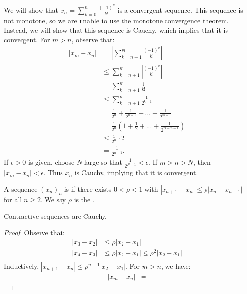     \begin{example}
        We will show that $x_n = \sum_{k = 0}^n \frac{(-1)^k}{k!}$ is a convergent sequence. This sequence is not monotone, so we are unable to use the monotone convergence theorem. Instead, we will show that this sequence is Cauchy, which implies that it is convergent. For $m > n$, observe that:
            \begin{equation*}
            \begin{split}
                |x_m - x_n|
                & = \left|\sum_{k = n + 1}^m \frac{(-1)^k}{k!}\right| \\
                & \leq \sum_{k = n + 1}^m \left|\frac{(-1)^k}{k!}\right| \\
                & = \sum_{k = n+1}^m \frac{1}{k!} \\
                & \leq \sum_{k = n+1}^m \frac{1}{2^{k-1}} \\
                & = \frac{1}{2^n} + \frac{1}{2^{n+1}} + ... + \frac{1}{2^{m-1}} \\
                & = \frac{1}{2^n} \left(1 + \frac{1}{2} + ... + \frac{1}{2^{m-n-1}}\right) \\
                & \leq \frac{1}{2^n}\cdot 2 \\
                & = \frac{1}{2^{n-1}}.
            \end{split}
            \end{equation*}
        If $\epsilon > 0$ is given, choose $N$ large so that $\frac{1}{2^{N - 1}} < \epsilon$. If $m > n > N$, then $|x_m - x_n| < \epsilon$. Thus $x_n$ is Cauchy, implying that it is convergent.
    \end{example}

    \begin{definition}
        A sequence $(x_n)_n$ is  if there exists $0 < \rho < 1$ with $|x_{n+1} - x_n| \leq \rho |x_n - x_{n-1}|$ for all $n \geq 2$. We say $\rho$ is the .
    \end{definition}

    \begin{proposition}
        Contractive sequences are Cauchy.
    \end{proposition}
        \begin{proof}
            Observe that:
                \begin{equation*}
                \begin{split}
                    |x_3 - x_2| &\leq \rho |x_2 - x_1| \\
                    |x_4 - x_3| &\leq \rho |x_2 - x_1|  \leq \rho^2 |x_2 - x_1|\\
                \end{split}
                \end{equation*}
            Inductively, $|x_{n+1} - x_n| \leq \rho^{n-1}|x_2 - x_1|$. For $m > n$, we have:
                \begin{equation*}
                \begin{split}
                    |x_m - x_n|
                    & = 
                \end{split}
                \end{equation*}
        \end{proof}